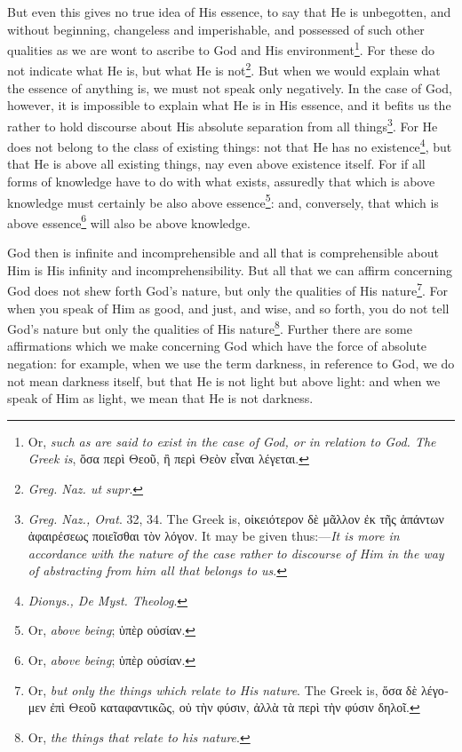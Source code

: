 But even this gives no true idea of His essence, to say that He is unbegotten, and without beginning, changeless and imperishable, and possessed of such other qualities as we are wont to ascribe to God and His environment\footnote{Or, \emph{such as are said to exist in the case of God, or in relation to God. The Greek is}, \textgreek{ὅσα περὶ Θεοῦ, ἢ περὶ Θεὸν εἶναι λέγεται}.}. For these do not indicate what He is, but what He is not\footnote{\emph{Greg. Naz. ut supr}.}. But when we would explain what the essence of anything is, we must not speak only negatively. In the case of God, however, it is impossible to explain what He is in His essence, and it befits us the rather to hold discourse about His absolute separation from all things\footnote{\emph{Greg. Naz., Orat}. 32, 34. The Greek is, \textgreek{οἰκειότερον δὲ μᾶλλον ἐκ τῆς ἁπάντων ἀφαιρέσεως ποιεῖσθαι τὸν λόγον}. It may be given thus:—\emph{It is more in accordance with the nature of the case rather to discourse of Him in the way of abstracting from him all that belongs to us}.}. For He does not belong to the class of existing things: not that He has no existence\footnote{\emph{Dionys., De Myst. Theolog}.}, but that He is above all existing things, nay even above existence itself. For if all forms of knowledge have to do with what exists, assuredly that which is above knowledge must certainly be also above essence\footnote{Or, \emph{above being}; \textgreek{ὑπὲρ οὐσίαν}.}: and, conversely, that which is above essence\footnote{Or, \emph{above being}; \textgreek{ὑπὲρ οὐσίαν}.} will also be above knowledge.

God then is infinite and incomprehensible and all that is comprehensible about Him is His infinity and incomprehensibility. But all that we can affirm concerning God does not shew forth God’s nature, but only the qualities of His nature\footnote{Or, \emph{but only the things which relate to His nature}. The Greek is, \textgreek{ὅσα δὲ λέγομεν ἐπὶ Θεοῦ καταφαντικῶς, οὐ τὴν φύσιν, ἀλλὰ τὰ περὶ τὴν φύσιν δηλοῖ}.}. For when you speak of Him as good, and just, and wise, and so forth, you do not tell God’s nature but only the qualities of His nature\footnote{Or, \emph{the things that relate to his nature}.}. Further there are some affirmations which we make concerning God which have the force of absolute negation: for example, when we use the term darkness, in reference to God, we do not mean darkness itself, but that He is not light but above light: and when we speak of Him as light, we mean that He is not darkness.


